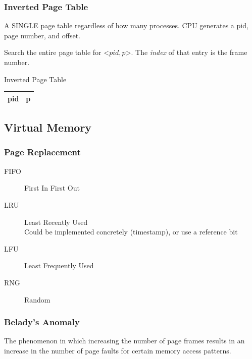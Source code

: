 \documentclass[a4paper]{article}
\begin{document}
\begin{multicols*}{2}
    \subsubsection*{Inverted Page Table}
    A SINGLE page table regardless of how many processes.
    CPU generates a pid, page number, and offset.
    \begin{multicols*}{2}
        Search the entire page table for <\(pid, p\)>.
        The \emph{index} of that entry is the frame number.
        \columnbreak
        \begin{center}
            Inverted Page Table \\
            \begin{tabular}{|cc|}
                \hline
                pid & p \\
                \hline
            \end{tabular}
        \end{center}
    \end{multicols*}

    \setlength{\columnsep}{1em}
    \subsection*{Virtual Memory}
    \begin{multicols}{2}
        \subsubsection*{Page Replacement}
        \begin{description}
            \item[FIFO] First In First Out
            \item[LRU] Least Recently Used \\
                Could be implemented concretely (timestamp), or use a reference
                bit
            \item[LFU] Least Frequently Used
            \item[RNG] Random
        \end{description}
        \columnbreak
        \subsubsection*{Belady's Anomaly}
        The phenomenon in which increasing the number of page frames results in
        an increase in the number of page faults for certain memory access
        patterns.
    \end{multicols}

\end{multicols*}
\end{document}
